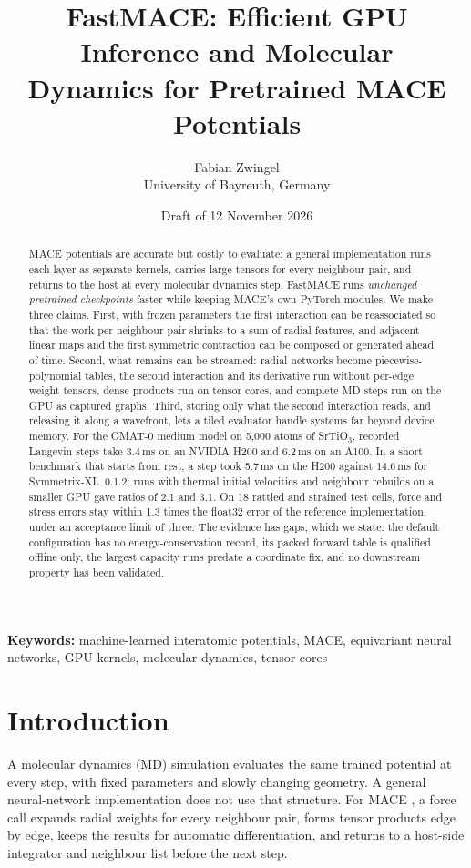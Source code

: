 \documentclass[11pt]{article}
\title{\textbf{FastMACE: Efficient GPU Inference and Molecular\\ Dynamics for Pretrained MACE Potentials}}
\author{Fabian Zwingel\\[0.3em]
\small University of Bayreuth, Germany}
\date{Draft of 12 November 2026}
\newcommand{\ms}{\,ms}
\begin{document}
\maketitle

\begin{abstract}
\noindent
MACE potentials are accurate but costly to evaluate: a general implementation runs each layer as separate
kernels, carries large tensors for every neighbour pair, and returns to the host at every molecular dynamics
step. FastMACE runs \emph{unchanged pretrained checkpoints} faster while keeping MACE's own PyTorch modules.
We make three claims. First, with frozen parameters the first interaction can be reassociated so that the work
per neighbour pair shrinks to a sum of radial features, and adjacent linear maps and the first symmetric
contraction can be composed or generated ahead of time. Second, what remains can be streamed: radial networks
become piecewise-polynomial tables, the second interaction and its derivative run without per-edge weight
tensors, dense products run on tensor cores, and complete MD steps run on the GPU as captured graphs. Third,
storing only what the second interaction reads, and releasing it along a wavefront, lets a tiled evaluator
handle systems far beyond device memory. For the OMAT-0 medium model on 5{,}000 atoms of SrTiO$_3$, recorded
Langevin steps take 3.4\ms{} on an NVIDIA H200 and 6.2\ms{} on an A100. In a short benchmark that starts from
rest, a step took 5.7\ms{} on the H200 against 14.6\ms{} for Symmetrix-XL~0.1.2; runs with thermal initial
velocities and neighbour rebuilds on a smaller GPU gave ratios of 2.1 and 3.1. On 18 rattled and strained test cells, force and stress errors stay within 1.3
times the float32 error of the reference implementation, under an acceptance limit of three. The evidence has
gaps, which we state: the default configuration has no energy-conservation record, its packed forward table is
qualified offline only, the largest capacity runs predate a coordinate fix, and no downstream property has
been validated.
\end{abstract}

\noindent\textbf{Keywords:} machine-learned interatomic potentials, MACE, equivariant neural networks,
GPU kernels, molecular dynamics, tensor cores

\section{Introduction}

A molecular dynamics (MD) simulation evaluates the same trained potential at every step, with fixed parameters
and slowly changing geometry. A general neural-network implementation does not use that structure. For MACE
\cite{batatia2022mace}, a force call expands radial weights for every neighbour pair, forms tensor products edge
by edge, keeps the results for automatic differentiation, and returns to a host-side integrator and neighbour
list before the next step.
\end{document}

